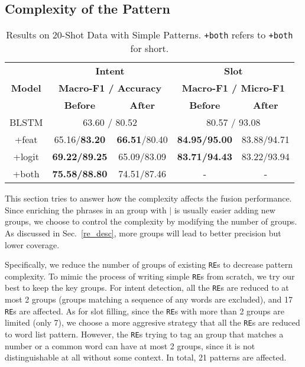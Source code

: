 \subsection{Complexity of the Pattern}
\label{sec_complexity}
\begin{table}
\setlength{\tabcolsep}{0.23em}
\centering
\small{
\begin{tabular}{|c|c|c|c|c|}

\hline
\multirow{3}{*}{\textbf{Model}}  & \multicolumn{2}{|c|}{\textbf{Intent}} & \multicolumn{2}{|c|}{\textbf{Slot}}  \\
\cline{2-5}
  & \multicolumn{2}{|c|}{\textbf{Macro-F1 / Accuracy}} & \multicolumn{2}{|c|}{\textbf{Macro-F1 / Micro-F1}}  \\
\cline{2-5}
  & \textbf{Before} & \textbf{After} & \textbf{Before} & \textbf{After} \\
\hline
BLSTM & \multicolumn{2}{|c|}{63.60 / 80.52} & \multicolumn{2}{|c|}{80.57 / 93.08}  \\
\hline
+feat & 65.16/\textbf{83.20} & \textbf{66.51}/80.40 & \textbf{84.95/95.00} & 83.88/94.71 \\
\hline
+logit & \textbf{69.22/89.25} & 65.09/83.09 & \textbf{83.71/94.43} & 83.22/93.94  \\
\hline
+both & \textbf{75.58/88.80} & 74.51/87.46 & - & - \\
\hline
\end{tabular}
}
\caption{Results on 20-Shot Data with Simple Patterns. \texttt{+both} refers to \ptatt\texttt{+both} for short.}
\label{tab_simple}
\end{table}

This section tries to answer how the \RE complexity affects the fusion performance.
Since enriching the phrases in an \RE group with $|$ is usually easier adding new groups,
we choose to control the \RE complexity by modifying the number of groups.
As discussed in Sec.~\ref{re_desc}, more \RE groups will lead to better precision but lower coverage.

Specifically, we reduce the number of groups of existing \texttt{RE}s to decrease pattern complexity.
To mimic the process of writing simple \texttt{RE}s from scratch, we try our best to keep the key \RE groups.
For intent detection, all the \texttt{RE}s are reduced to at most 2 groups (groups matching a sequence of any words are excluded), and 17 \texttt{RE}s are affected.
As for slot filling, since the \texttt{RE}s with more than 2 groups are limited (only 7), we choose a more aggresive strategy that all the \texttt{RE}s are reduced to word list pattern.
However, the \texttt{RE}s trying to tag an \RE group that matches a number or a common word can have at most 2 groups, since it is not distinguishable at all without some context.
In total, 21 patterns are affected.

